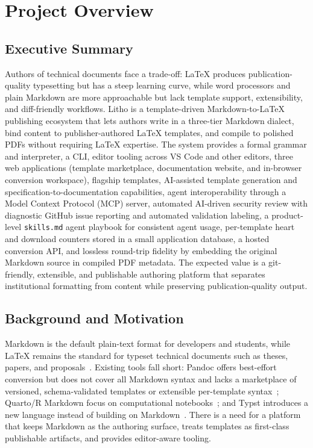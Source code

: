 
\chapter{Project Overview}
\label{chap:overview}

\section{Executive Summary}
Authors of technical documents face a trade-off: LaTeX produces publication-quality typesetting but has a steep learning curve, while word processors and plain Markdown are more approachable but lack template support, extensibility, and diff-friendly workflows. Litho is a template-driven Markdown-to-LaTeX publishing ecosystem that lets authors write in a three-tier Markdown dialect, bind content to publisher-authored LaTeX templates, and compile to polished PDFs without requiring LaTeX expertise. The system provides a formal grammar and interpreter, a CLI, editor tooling across VS Code and other editors, three web applications (template marketplace, documentation website, and in-browser conversion workspace), flagship templates, AI-assisted template generation and specification-to-documentation capabilities, agent interoperability through a Model Context Protocol (MCP) server, automated AI-driven security review with diagnostic GitHub issue reporting and automated validation labeling, a product-level \texttt{skills.md} agent playbook for consistent agent usage, per-template heart and download counters stored in a small application database, a hosted conversion API, and lossless round-trip fidelity by embedding the original Markdown source in compiled PDF metadata. The expected value is a git-friendly, extensible, and publishable authoring platform that separates institutional formatting from content while preserving publication-quality output.

\section{Background and Motivation}
Markdown is the default plain-text format for developers and students, while LaTeX remains the standard for typeset technical documents such as theses, papers, and proposals~\cite{ref1,ref2}. Existing tools fall short: Pandoc offers best-effort conversion but does not cover all Markdown syntax and lacks a marketplace of versioned, schema-validated templates or extensible per-template syntax~\cite{ref3}; Quarto/R Markdown focus on computational notebooks~\cite{ref4}; and Typst introduces a new language instead of building on Markdown~\cite{ref5}. There is a need for a platform that keeps Markdown as the authoring surface, treats templates as first-class publishable artifacts, and provides editor-aware tooling.

